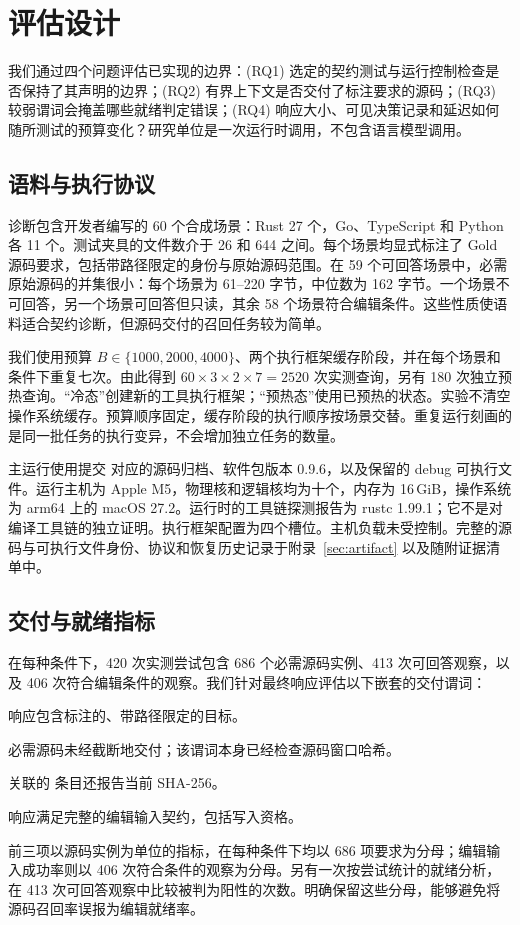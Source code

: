 \section{评估设计}
\label{sec:evaluation}
我们通过四个问题评估已实现的边界：(RQ1) 选定的契约测试与运行控制检查是否保持了其声明的边界；(RQ2) 有界上下文是否交付了标注要求的源码；(RQ3) 较弱谓词会掩盖哪些就绪判定错误；(RQ4) 响应大小、可见决策记录和延迟如何随所测试的预算变化？研究单位是一次运行时调用，不包含语言模型调用。

\subsection{语料与执行协议}
诊断包含开发者编写的 60 个合成场景：Rust 27 个，Go、TypeScript 和 Python 各 11 个。测试夹具的文件数介于 26 和 644 之间。每个场景均显式标注了 Gold 源码要求，包括带路径限定的身份与原始源码范围。在 59 个可回答场景中，必需原始源码的并集很小：每个场景为 61--220 字节，中位数为 162 字节。一个场景不可回答，另一个场景可回答但只读，其余 58 个场景符合编辑条件。这些性质使语料适合契约诊断，但源码交付的召回任务较为简单。

我们使用预算 $B\in\{1000,2000,4000\}$、两个执行框架缓存阶段，并在每个场景和条件下重复七次。由此得到 $60\times3\times2\times7=2520$ 次实测查询，另有 180 次独立预热查询。“冷态”创建新的工具执行框架；“预热态”使用已预热的状态。实验不清空操作系统缓存。预算顺序固定，缓存阶段的执行顺序按场景交替。重复运行刻画的是同一批任务的执行变异，不会增加独立任务的数量。

主运行使用提交  对应的源码归档、软件包版本 0.9.6，以及保留的 debug 可执行文件。运行主机为 Apple M5，物理核和逻辑核均为十个，内存为 16\,GiB，操作系统为 arm64 上的 macOS 27.2。运行时的工具链探测报告为 rustc 1.99.1；它不是对编译工具链的独立证明。执行框架配置为四个槽位。主机负载未受控制。完整的源码与可执行文件身份、协议和恢复历史记录于附录~\ref{sec:artifact} 以及随附证据清单中。

\subsection{交付与就绪指标}
在每种条件下，420 次实测尝试包含 686 个必需源码实例、413 次可回答观察，以及 406 次符合编辑条件的观察。我们针对最终响应评估以下嵌套的交付谓词：
\begin{description}[style=unboxed,leftmargin=0pt,font=\bfseries]
\item[身份。] 响应包含标注的、带路径限定的目标。
\item[原始函数体。] 必需源码未经截断地交付；该谓词本身已经检查源码窗口哈希。
\item[文件元数据。] 关联的  条目还报告当前 SHA-256。
\item[编辑输入。] 响应满足完整的编辑输入契约，包括写入资格。
\end{description}
前三项以源码实例为单位的指标，在每种条件下均以 686 项要求为分母；编辑输入成功率则以 406 次符合条件的观察为分母。另有一次按尝试统计的就绪分析，在 413 次可回答观察中比较被判为阳性的次数。明确保留这些分母，能够避免将源码召回率误报为编辑就绪率。

